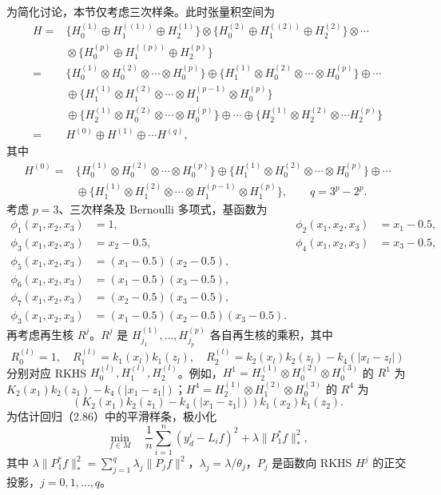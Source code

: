 为简化讨论，本节仅考虑三次样条。此时张量积空间为
\[
\begin{aligned}
H={}&\{H_0^{(1)}\oplus H_1^{((1))}\oplus H_2^{(1)}\}
\otimes\{H_0^{(2)}\oplus H_1^{((2))}\oplus H_2^{(2)}\}\otimes\cdots\\
&{}\otimes\{H_0^{(p)}\oplus H_1^{((p))}\oplus H_2^{(p)}\}\\
={}&\{H_0^{(1)}\otimes H_0^{(2)}\otimes\cdots\otimes H_0^{(p)}\}
\oplus\{H_1^{(1)}\otimes H_0^{(2)}\otimes\cdots\otimes H_0^{(p)}\}
\oplus\cdots\\
&{}\oplus\{H_1^{(1)}\otimes H_1^{(2)}\otimes\cdots
\otimes H_1^{(p-1)}\otimes H_0^{(p)}\}\\
&{}\oplus\{H_2^{(1)}\otimes H_0^{(2)}\otimes\cdots\otimes H_0^{(p)}\}
\oplus\cdots\oplus\{H_2^{(1)}\otimes H_2^{(2)}\otimes\cdots H_2^{(p)}\}\\
={}&H^{(0)}\oplus H^{(1)}\oplus\cdots H^{(q)},
\end{aligned}
\]
其中
\[
\begin{aligned}
H^{(0)}
={}&\{H_0^{(1)}\otimes H_0^{(2)}\otimes\cdots\otimes H_0^{(p)}\}
\oplus\{H_1^{(1)}\otimes H_0^{(2)}\otimes\cdots\otimes H_0^{(p)}\}
\oplus\cdots\\
&{}\oplus\{H_1^{(1)}\otimes H_1^{(2)}\otimes\cdots
\otimes H_1^{(p-1)}\otimes H_1^{(p)}\},\qquad q=3^p-2^p.
\end{aligned}
\]
考虑 $p=3$、三次样条及 Bernoulli 多项式，基函数为
\[
\begin{aligned}
\phi_1(x_1,x_2,x_3)&=1,&\phi_2(x_1,x_2,x_3)&=x_1-0.5,\\
\phi_3(x_1,x_2,x_3)&=x_2-0.5,&\phi_4(x_1,x_2,x_3)&=x_3-0.5,\\
\phi_5(x_1,x_2,x_3)&=(x_1-0.5)(x_2-0.5),\\
\phi_6(x_1,x_2,x_3)&=(x_1-0.5)(x_3-0.5),\\
\phi_7(x_1,x_2,x_3)&=(x_2-0.5)(x_3-0.5),\\
\phi_3(x_1,x_2,x_3)&=(x_1-0.5)(x_2-0.5)(x_3-0.5).
\end{aligned}
\]
再考虑再生核 $R^j$。$R^j$ 是 $H_{j_1}^{(1)},\ldots,H_{j_p}^{(p)}$ 各自再生核的乘积，其中
\[
R_0^{(l)}=1,\quad R_1^{(l)}=k_1(x_l)k_1(z_l),\quad
R_2^{(l)}=k_2(x_l)k_2(z_l)-k_4(|x_l-z_l|)
\]
分别对应 RKHS $H_0^{(l)},H_1^{(l)},H_2^{(l)}$。例如，$H^1=H_2^{(1)}\otimes H_0^{(2)}\otimes H_0^{(3)}$ 的 $R^1$ 为 $K_2(x_1)k_2(z_1)-k_4(|x_1-z_1|)$；$H^4=H_2^{(1)}\otimes H_1^{(2)}\otimes H_0^{(3)}$ 的 $R^4$ 为
\[
(K_2(x_1)k_2(z_1)-k_4(|x_1-z_1|))k_1(x_2)k_1(z_2).
\]
为估计回归（2.86）中的平滑样条，极小化
\begin{equation}
\min_{f\in M}\quad
\frac1n\sum_{i=1}^{n}(y_d^i-L_if)^2+\lambda\lVert P_1^*f\rVert_*^2,
\tag{2.88}
\end{equation}
其中 $\lambda\lVert P_1^*f\rVert_*^2=\sum_{j=1}^{q}\lambda_j\lVert P_jf\rVert^2$，$\lambda_j=\lambda/\theta_j$，$P_j$ 是函数向 RKHS $H^j$ 的正交投影，$j=0,1,\ldots,q$。

